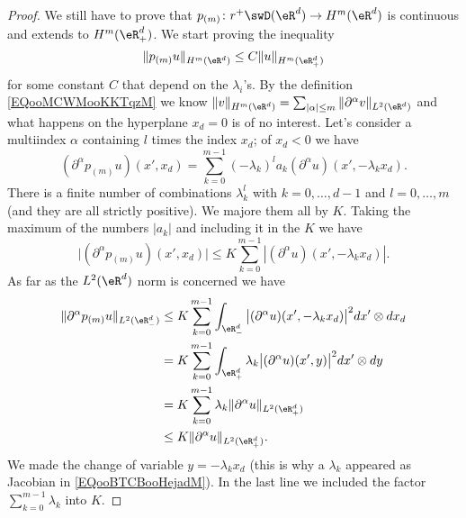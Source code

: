 \begin{proof}
    We still have to prove that \(p_{(m)}\colon r^+\swD(\eR^d)\to H^m(\eR^d)\) is continuous and extends to \( H^m(\eR^d_+)\). We start proving the inequality
    \begin{equation}
        \| p_{(m)}u \|_{H^m(\eR^d)}\leq C \| u \|_{H^m(\eR^d_+)}
    \end{equation}
    for some constant \( C\) that depend on the \( \lambda_i\)'s. By the definition \ref{EQooMCWMooKKTqzM} we know \( \| v \|_{H^m(\eR^d)}=\sum_{| \alpha |\leq m}\| \partial^{\alpha}v \|_{L^2(\eR^d)}\) and what happens on the hyperplane \( x_d=0\) is of no interest. Let's consider a multiindex \( \alpha\) containing \( l\) times the index \( x_d\); of \( x_d<0\) we have
    \begin{equation}
        (\partial^{\alpha}p_{(m)}u)(x',x_d)=\sum_{k=0}^{m-1}(-\lambda_k)^la_k(\partial^{\alpha}u)(x',-\lambda_kx_d).
    \end{equation}
    There is a finite number of combinations \( \lambda_k^l\) with \( k=0,\ldots, d-1\) and \( l=0,\ldots, m\) (and they are all strictly positive). We majore them all by \( K\). Taking the maximum of the numbers \( | a_k |\) and including it in the \( K\) we have
    \begin{equation}
        \big| (\partial^{\alpha}p_{(m)}u)(x',x_d) \big|\leq K \sum_{k=0}^{m-1}| (\partial^{\alpha}u)(x',-\lambda_k x_d) |.
    \end{equation}
    As far as the \( L^2(\eR^d)\) norm is concerned we have
    \begin{subequations}
        \begin{align}
            \| \partial^{\alpha}p_{(m)}u \|_{L^2(\eR^d_-)}&\leq K\sum_{k=0}^{m-1}\int_{\eR^d_-}\big| (\partial^{\alpha}u)(x',-\lambda_k x_d) \big|^2dx'\otimes dx_d\\
            &=K\sum_{k=0}^{m-1}\int_{\eR^d_+}\lambda_k\big| (\partial^{\alpha}u)(x',y) \big|^2dx'\otimes dy  \label{EQooBTCBooHejadM}\\
            &=K\sum_{k=0}^{m-1}\lambda_k\| \partial^{\alpha}u \|_{L^2(\eR^d_+)}\\
            &\leq K\| \partial^{\alpha}u \|_{L^2(\eR^d_+)}.
        \end{align}
    \end{subequations}
    We made the change of variable \(y=-\lambda_k x_d\) (this is why a \( \lambda_k\) appeared as Jacobian in \eqref{EQooBTCBooHejadM}). In the last line we included the factor \( \sum_{k=0}^{m-1}\lambda_k\) into \( K\).


\end{proof}
